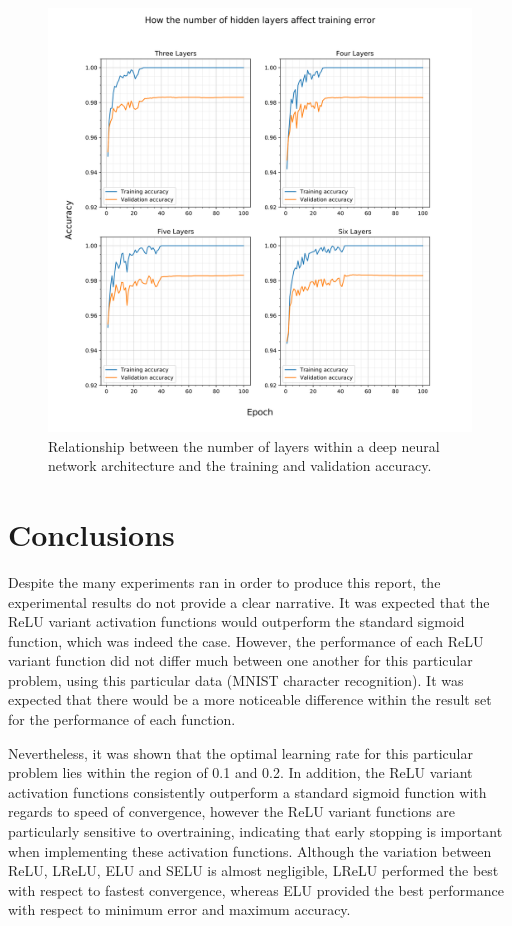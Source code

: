 \documentclass{article}
\begin{document}
\begin{figure}[tb]
\vskip 5mm
\begin{center}
\centerline{\includegraphics[width=\columnwidth]{hidden_layers_affects_svg}}
\caption{Relationship between the number of layers within a deep neural network architecture and the training and validation accuracy.}
\label{fig:dnn-accuracy}
\end{center}
\vskip -5mm
\end{figure}

\section{Conclusions}
\label{sec:concl}

Despite the many experiments ran in order to produce this report, the experimental results do not provide a clear narrative. It was expected that the ReLU variant activation functions would outperform the standard sigmoid function, which was indeed the case. However, the performance of each ReLU variant function did not differ much between one another for this particular problem, using this particular data (MNIST character recognition). It was expected that there would be a more noticeable difference within the result set for the performance of each function. 

Nevertheless, it was shown that the optimal learning rate for this particular problem lies within the region of 0.1 and 0.2. In addition, the ReLU variant activation functions consistently outperform a standard sigmoid function with regards to speed of convergence, however the ReLU variant functions are particularly sensitive to overtraining, indicating that early stopping is important when implementing these activation functions. Although the variation between ReLU, LReLU, ELU and SELU is almost negligible, LReLU performed the best with respect to fastest convergence, whereas ELU provided the best performance with respect to minimum error and maximum accuracy.
\end{document}

